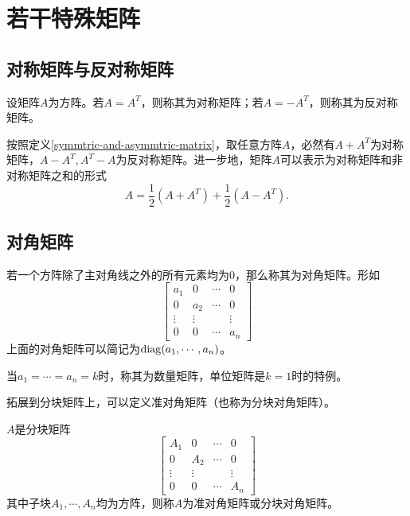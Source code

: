 \section{若干特殊矩阵}

\subsection{对称矩阵与反对称矩阵}

\begin{definition}
    \label{symmtric-and-asymmtric-matrix}
    设矩阵$A$为方阵。若$A=A^T$，则称其为对称矩阵；若$A=-A^T$，则称其为反对称矩阵。
\end{definition}

\begin{remark}
    按照定义\ref{symmtric-and-asymmtric-matrix}，取任意方阵$A$，必然有$A+A^T$为对称矩阵，$A-A^T,A^T-A$为反对称矩阵。进一步地，矩阵$A$可以表示为对称矩阵和非对称矩阵之和的形式
    \[ A=\frac12(A+A^T)+\frac12(A-A^T). \]
\end{remark}

\subsection{对角矩阵}

\begin{definition}
    \label{diag-matrix}
    若一个方阵除了主对角线之外的所有元素均为$0$，那么称其为对角矩阵。形如
    \[
        \begin{bmatrix}
        a_1 & 0     & \cdots & 0 \\
        0   & a_2   & \cdots & 0 \\
        \vdots & \vdots &    & \vdots \\
        0 & 0 & \cdots & a_n
        \end{bmatrix}  
    \]
    上面的对角矩阵可以简记为$\mathrm{diag}(a_1,\cdots,a_n)$。

    当$a_1=\cdots=a_n=k$时，称其为数量矩阵，单位矩阵是$k=1$时的特例。
\end{definition}

拓展到分块矩阵上，可以定义准对角矩阵（也称为分块对角矩阵）。

\begin{definition}
    \label{block-diag-matrix}
    $A$是分块矩阵
    \[
        \begin{bmatrix}
        A_1 & 0     & \cdots & 0 \\
        0   & A_2   & \cdots & 0 \\
        \vdots & \vdots &    & \vdots \\
        0 & 0 & \cdots & A_n
        \end{bmatrix}  
    \]
    其中子块$A_1,\cdots,A_n$均为方阵，则称$A$为准对角矩阵或分块对角矩阵。
\end{definition}

